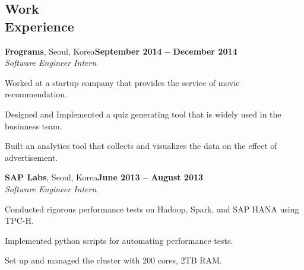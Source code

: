 \documentclass[11pt,margin,line]{cv}
\begin{document}
\begin{resume}
    \section{\mysidestyle Work\\Experience}
    \textbf{Frograms}, Seoul, Korea\hfill \textbf{September 2014 -- December 2014} \vspace{1mm}\\\vspace{0mm}%
    \textsl{Software Engineer Intern}
    \vspace{-2mm}\\\vspace{-1mm}%
    \begin{list3}
        \item Worked at a startup company that provides the service of movie recommendation.
        \item Designed and Implemented a quiz generating tool that is widely used in the businness team.
        \item Built an analytics tool that collects and visualizes the data on the effect of advertisement.
    \end{list3}

    \textbf{SAP Labs}, Seoul, Korea\hfill \textbf{June 2013 -- August 2013} \vspace{1mm}\\\vspace{0mm}%
    \textsl{Software Engineer Intern}
    \vspace{-2mm}\\\vspace{-1mm}%
    \begin{list3}
        \item Conducted rigorous performance tests on Hadoop, Spark, and SAP HANA using TPC-H.
        \item Implemented python scripts for automating performance tests.
        \item Set up and managed the cluster with 200 cores, 2TB RAM.
    \end{list3}



\end{resume}
\end{document}
